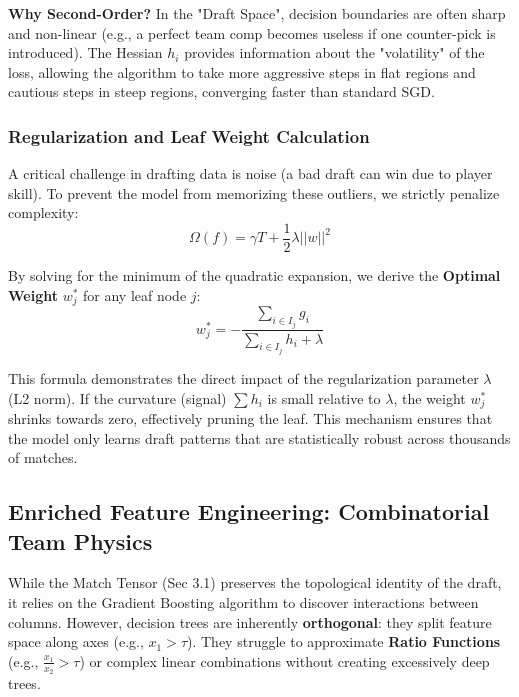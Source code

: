 \documentclass[12pt, a4paper]{article}
\begin{document}
    \textbf{Why Second-Order?} In the "Draft Space", decision boundaries are often sharp and non-linear (e.g., a perfect team comp becomes useless if one counter-pick is introduced). The Hessian $h_i$ provides information about the "volatility" of the loss, allowing the algorithm to take more aggressive steps in flat regions and cautious steps in steep regions, converging faster than standard SGD.

    \subsubsection{Regularization and Leaf Weight Calculation}
    A critical challenge in drafting data is noise (a bad draft can win due to player skill). To prevent the model from memorizing these outliers, we strictly penalize complexity:
    \begin{equation}
        \Omega(f) = \gamma T + \frac{1}{2}\lambda ||w||^2
    \end{equation}

    By solving for the minimum of the quadratic expansion, we derive the \textbf{Optimal Weight} $w_j^*$ for any leaf node $j$:
    \begin{equation}
        w_j^* = - \frac{\sum_{i \in I_j} g_i}{\sum_{i \in I_j} h_i + \lambda}
    \end{equation}

    This formula demonstrates the direct impact of the regularization parameter $\lambda$ (L2 norm). If the curvature (signal) $\sum h_i$ is small relative to $\lambda$, the weight $w_j^*$ shrinks towards zero, effectively pruning the leaf. This mechanism ensures that the model only learns draft patterns that are statistically robust across thousands of matches.

    \subsection{Enriched Feature Engineering: Combinatorial Team Physics}

    While the Match Tensor (Sec 3.1) preserves the topological identity of the draft, it relies on the Gradient Boosting algorithm to discover interactions between columns. However, decision trees are inherently \textbf{orthogonal}: they split feature space along axes (e.g., $x_1 > \tau$). They struggle to approximate \textbf{Ratio Functions} (e.g., $\frac{x_1}{x_2} > \tau$) or complex linear combinations without creating excessively deep trees.
\end{document}
